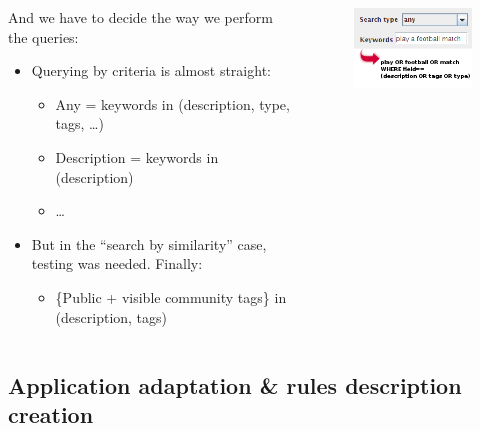 \begin{frame}


\begin{columns}

	\begin{column}{7cm}
	
	And we have to decide the way we perform the queries:
	\begin{itemize}
      	\item Querying by criteria is almost straight:
		\begin{itemize}
      		\item Any = keywords in (description, type, tags, \ldots)
      		\item Description = keywords in (description)
      		\item \ldots
        \end{itemize}
        
        \item But in the ``search by similarity'' case, testing was needed.
        Finally:
		\begin{itemize}
      		\item \{Public + visible community tags\} in (description, tags)
        \end{itemize}
	\end{itemize}

		
	
	\end{column}
	
		\begin{column}{5cm}
	    
			\begin{figure}
			 	\includegraphics[scale=0.5]{img/query-rich.png}
			\end{figure}
	    
	    \end{column}
	
\end{columns}

\end{frame}


\subsection{Application adaptation \& rules description creation}

